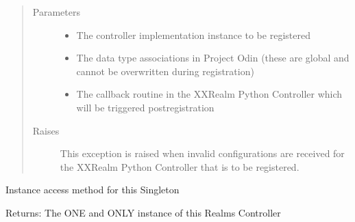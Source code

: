 \documentclass[letterpaper,10pt,english]{sphinxmanual}
\begin{document}
\begin{fulllineitems}
\begin{fulllineitems}
\begin{description}
\end{description}
\begin{quote}\begin{description}
\item[{Parameters}] \leavevmode\begin{itemize}
\item {} 
\sphinxAtStartPar
{} \textendash{} The controller implementation instance to be registered

\item {} 
\sphinxAtStartPar
{} \textendash{} The data type associations in Project Odin (these are global and cannot be
overwritten during registration)

\item {} 
\sphinxAtStartPar
{} \textendash{} The callback routine in the XXRealm Python Controller which will be triggered post\sphinxhyphen{}registration

\end{itemize}

\item[{Raises}] \leavevmode
\sphinxAtStartPar
{\hyperref[\detokenize{Forge:Forge.InvalidControllerConfiguration}]{}} \textendash{} This exception is raised when invalid configurations are received for the
    XXRealm Python Controller that is to be registered.

\end{description}\end{quote}

\end{fulllineitems}


\begin{fulllineitems}
\label{\detokenize{Realms:Realms.Realms.get_realms}}
\sphinxAtStartPar
Instance access method for this Singleton

\sphinxAtStartPar
Returns: The ONE and ONLY instance of this Realms Controller

\end{fulllineitems}


\end{fulllineitems}
\end{document}
